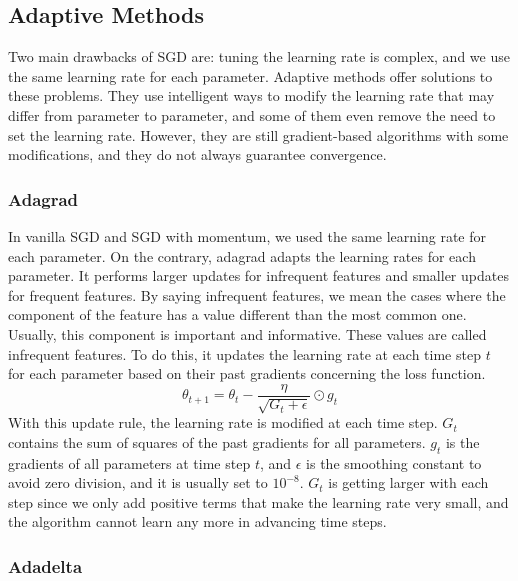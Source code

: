 \documentclass[a4paper, nobind]{templates/ociamthesis}
\begin{document}
\hypertarget{adaptive-methods}{%
\subsection{Adaptive Methods}\label{adaptive-methods}}

Two main drawbacks of SGD are: tuning the learning rate is complex, and we use the same learning rate for each parameter. Adaptive methods offer solutions to these problems. They use intelligent ways to modify the learning rate that may differ from parameter to parameter, and some of them even remove the need to set the learning rate. However, they are still gradient-based algorithms with some modifications, and they do not always guarantee convergence.

\hypertarget{adagrad}{%
\subsubsection{Adagrad}\label{adagrad}}

\noindent In vanilla SGD and SGD with momentum, we used the same learning rate for each parameter. On the contrary, adagrad adapts the learning rates for each parameter. It performs larger updates for infrequent features and smaller updates for frequent features. By saying infrequent features, we mean the cases where the component of the feature has a value different than the most common one. Usually, this component is important and informative. These values are called infrequent features. To do this, it updates the learning rate at each time step \(t\) for each parameter based on their past gradients concerning the loss function.
\[
\theta_{t+1}=\theta_{t}-\frac{\eta}{\sqrt{G_{t}+\epsilon}} \odot g_{t}
\]
With this update rule, the learning rate is modified at each time step. \(G_t\) contains the sum of squares of the past gradients for all parameters. \(g_t\) is the gradients of all parameters at time step \(t\), and \(\epsilon\) is the smoothing constant to avoid zero division, and it is usually set to \(10^{-8}\). \(G_t\) is getting larger with each step since we only add positive terms that make the learning rate very small, and the algorithm cannot learn any more in advancing time steps.

\hypertarget{adadelta}{%
\subsubsection{Adadelta}\label{adadelta}}
\end{document}
